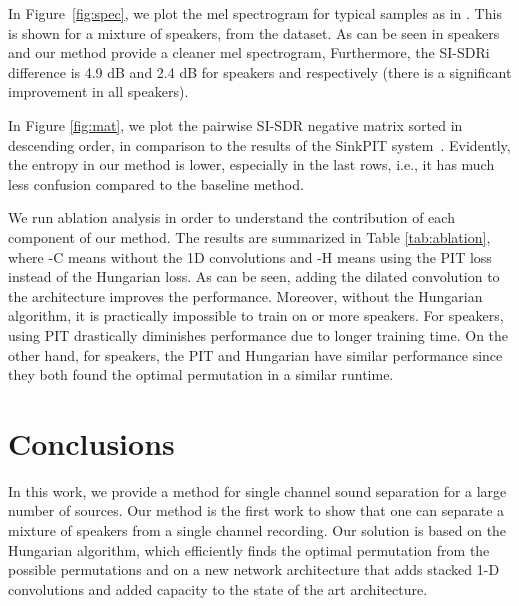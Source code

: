 \documentclass[a4paper]{article}
\begin{document}
In Figure~\ref{fig:spec}, we plot the mel spectrogram for typical samples as in \cite{tachibana2020towards}. This is shown for a mixture of  speakers, from the  dataset. As can be seen in speakers  and  our method provide a cleaner mel spectrogram, Furthermore, the SI-SDRi difference is 4.9 dB and 2.4 dB for speakers  and  respectively (there is a significant improvement in all speakers). 

In Figure \ref{fig:mat}, we plot the pairwise SI-SDR negative matrix  sorted in descending order, in comparison to the results of the SinkPIT system~\cite{tachibana2020towards}. Evidently, the entropy in our method is lower, especially in the last rows, i.e., it has much less confusion compared to the baseline method.

 We run ablation analysis in order to understand the contribution of each component of our method. The results are summarized in Table \ref{tab:ablation}, where -C means without the 1D convolutions and -H means using the PIT loss instead of the Hungarian loss. As can be seen, adding the dilated convolution to the architecture improves the performance. Moreover, without the Hungarian algorithm, it is practically impossible to train on  or more speakers. For  speakers, using PIT drastically diminishes performance due to longer training time. On the other hand, for  speakers, the PIT and Hungarian have similar performance since they both found the optimal permutation in a similar runtime. 

\section{Conclusions}
In this work, we provide a method for single channel sound separation for a large number of sources. Our method is the first work to show that one can separate a mixture of  speakers from a single channel recording. Our solution is based on the Hungarian algorithm, which efficiently finds the optimal permutation from the  possible permutations and on a new network architecture that adds stacked 1-D convolutions and added capacity to the state of the art architecture. 
\end{document}
